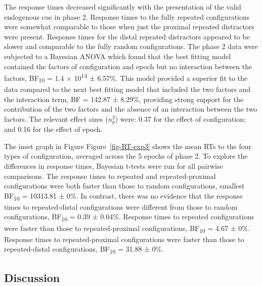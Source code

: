 \documentclass[
  man,
  floatsintext,
  longtable,
  nolmodern,
  notxfonts,
  notimes,
  colorlinks=true,linkcolor=blue,citecolor=blue,urlcolor=blue]{apa7}
\begin{document}
The response times decreased significantly with the presentation of the
valid endogenous cue in phase 2. Response times to the fully repeated
configurations were somewhat comparable to those when just the proximal
repeated distractors were present. Response times for the distal
repeated distractors appeared to be slower and comparable to the fully
random configurations. The phase 2 data were subjected to a Bayesian
ANOVA which found that the best fitting model contained the factors of
configuration and epoch but no interaction between the factors,
BF\textsubscript{10} = 1.4 × 10\textsuperscript{14} ± 6.57\%. This model
provided a superior fit to the data compared to the next best fitting
model that included the two factors and the interaction term, BF =
142.87 ± 8.29\%, providing strong support for the contribution of the
two factors and the absence of an interaction between the two factors.
The relevant effect sizes (\(n^2_p\)) were: 0.37 for the effect of
configuration; and 0.16 for the effect of epoch.

The inset graph in Figure Figure~\ref{fig-RT-exp3} shows the mean RTs to
the four types of configuration, averaged across the 5 epochs of phase
2. To explore the differences in response times, Bayesian t-tests were
run for all pairwise comparisons. The response times to repeated and
repeated-proximal configurations were both faster than those to random
configurations, smallest BF\textsubscript{10} = 10313.81 ± 0\%. In
contrast, there was no evidence that the response times to
repeated-distal configurations were different from those to random
configurations, BF\textsubscript{10} = 0.39 ± 0.04\%. Response times to
repeated configurations were faster than those to repeated-proximal
configurations, BF\textsubscript{10} = 4.67 ± 0\%. Response times to
repeated-proximal configurations were faster than those to
repeated-distal configurations, BF\textsubscript{10} = 31.88 ± 0\%.

\subsection{Discussion}\label{discussion-2}
\end{document}
